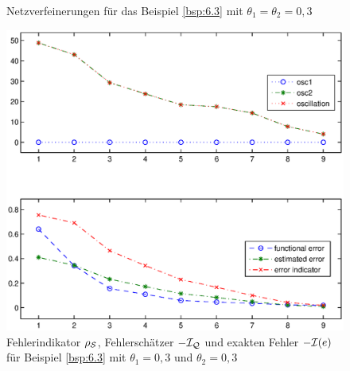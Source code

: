 \begin{bsp}
\begin{figure}[h]
\begin{center}
\hfill
{}
\end{center}
\caption{Netzverfeinerungen für das Beispiel \ref{bsp:6.3} mit $\theta_1=\theta_2=0,3$\label{abb:6.8}}
\end{figure}

\begin{figure}[ht]
\begin{center}
\includegraphics[width=12cm]{Abbildungen/adaptive_solution_example3.eps}
\end{center}
\caption[Diagramm mit dem Fehler und der Oszillation für Beispiel \ref{bsp:6.3}]{Fehlerindikator $\rho_{\mathcal S}$, Fehlerschätzer $-\mathcal I_{\mathcal Q}$ und exakten Fehler $-\mathcal I(e)$ für Beispiel \ref{bsp:6.3} mit $\theta_1=0,3$ und $\theta_2=0,3$\label{abb:6.9}}
\end{figure}


\end{bsp}
